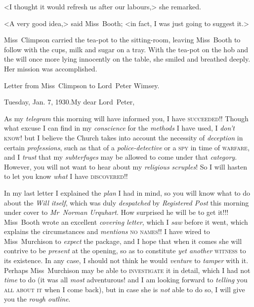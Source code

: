 <I thought it would refresh us after our labours,> she remarked.

<A very good idea,> said Miss~Booth; <in fact, I was just going to suggest it.>

Miss~Climpson carried the tea-pot to the sitting-room, leaving Miss~Booth to follow with the cups, milk and sugar on a tray. With the tea-pot on the hob and the will once more lying innocently on the table, she smiled and breathed deeply. Her mission was accomplished.

\divider

Letter from Miss~Climpson to Lord~Peter Wimsey.

\begin{mail}{Tuesday, Jan. 7, 1930.}{My dear Lord~Peter,}

As my \emph{telegram} this morning will have informed you, I have \textsc{succeeded}!! Though what excuse I can find in my \emph{conscience} for the \emph{methods} I have used, I \emph{don't} \textsc{know}! but I believe the Church takes into account the necessity of \emph{deception} in certain \emph{professions}, such as that of a \emph{police-detective} or a \textsc{spy} in time of \textsc{warfare}, and I \emph{trust} that my \emph{subterfuges} may be allowed to come under that \emph{category}. However, you will not want to hear about my \emph{religious scruples}! So I will hasten to let you know \emph{what} I have \textsc{discovered}!!

In my last letter I explained the \emph{plan} I had in mind, so you will know what to do about the \emph{Will itself}, which was duly \emph{despatched} by \emph{Registered Post} this morning under cover to \emph{Mr~Norman Urquhart}. How surprised he will be to get it!!! Miss~Booth wrote an excellent \emph{covering letter}, which I \emph{saw} before it went, which explains the circumstances and \emph{mentions} \textsc{no} \textsc{names}!! I have wired to Miss~Murchison to \emph{expect} the package, and I hope that when it comes she will contrive to be \emph{present} at the opening, so as to constitute \emph{yet another} \textsc{witness} to its existence. In any case, I should not think he would \emph{venture} to \emph{tamper} with it. Perhaps Miss~Murchison may be able to \textsc{investigate} it in detail, which I had not \emph{time} to do (it was all \emph{most} adventurous! and I am looking forward to \emph{telling} you \textsc{all} \textsc{about} \textsc{it} when I come back), but in case she is \emph{not} able to do so, I will give you the \emph{rough outline}.


\end{mail}
